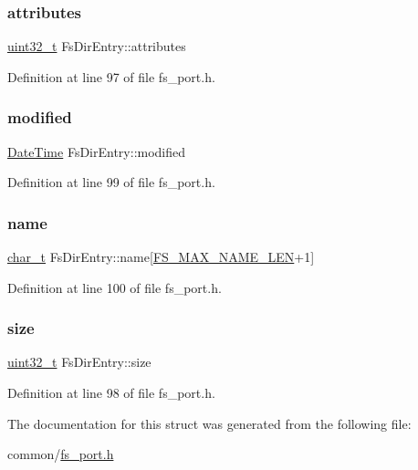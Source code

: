 \subsubsection{\texorpdfstring{attributes}{attributes}}
{\footnotesize\ttfamily \hyperlink{stdint_8h_a435d1572bf3f880d55459d9805097f62}{uint32\+\_\+t} Fs\+Dir\+Entry\+::attributes}



Definition at line 97 of file fs\+\_\+port.\+h.

\mbox{\label{structFsDirEntry_abd332197750fa0d7181d206355a86b99}} 
\subsubsection{\texorpdfstring{modified}{modified}}
{\footnotesize\ttfamily \hyperlink{structDateTime}{Date\+Time} Fs\+Dir\+Entry\+::modified}



Definition at line 99 of file fs\+\_\+port.\+h.

\mbox{\label{structFsDirEntry_ab2a81b6bc89dc202e25448d2afdbae5b}} 
\subsubsection{\texorpdfstring{name}{name}}
{\footnotesize\ttfamily \hyperlink{compiler__port_8h_a40bb5262bf908c328fbcfbe5d29d0201}{char\+\_\+t} Fs\+Dir\+Entry\+::name\mbox{[}\hyperlink{fs__port_8h_a17f57e73738b6fd8b600eb2b4e0e5c71}{F\+S\+\_\+\+M\+A\+X\+\_\+\+N\+A\+M\+E\+\_\+\+L\+EN}+1\mbox{]}}



Definition at line 100 of file fs\+\_\+port.\+h.

\mbox{\label{structFsDirEntry_acface51e05962d480c731d0b0c7b1d0e}} 
\subsubsection{\texorpdfstring{size}{size}}
{\footnotesize\ttfamily \hyperlink{stdint_8h_a435d1572bf3f880d55459d9805097f62}{uint32\+\_\+t} Fs\+Dir\+Entry\+::size}



Definition at line 98 of file fs\+\_\+port.\+h.



The documentation for this struct was generated from the following file\+:\begin{DoxyCompactItemize}
\item 
common/\hyperlink{fs__port_8h}{fs\+\_\+port.\+h}\end{DoxyCompactItemize}
